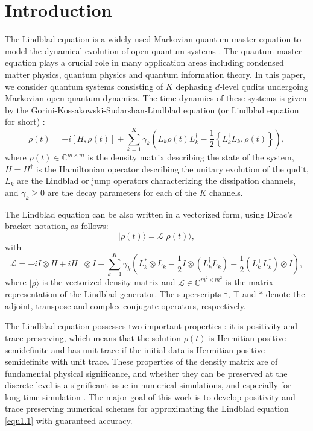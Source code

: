 \documentclass[preprint,3p,compress,12pt]{elsarticle}
\numberwithin{equation}{section}
\numberwithin{figure}{section}
\begin{document}
\section{Introduction}
The Lindblad equation is a widely used Markovian quantum master equation to model the dynamical evolution of open quantum systems \cite{Breuer,Davies1976}. The quantum master equation plays a crucial role in many application areas including condensed matter physics, quantum physics and quantum information theory. In this paper, we consider quantum systems consisting of $K$ dephasing $d$-level qudits undergoing Markovian open quantum dynamics. The time dynamics of these systems is given by the Gorini-Kossakowski-Sudarshan-Lindblad equation (or Lindblad equation for short) \cite{Gorini,Lindblad}:
\begin{equation}\label{equ1.1}
  \dot{\rho}(t)=-i[H,\rho(t)]+\sum_{k=1}^K\gamma_k\left(L_k\rho(t) L_k^{\dag}-\frac{1}{2}\left\{L_k^{\dag}L_k,\rho(t)\right\}\right),
\end{equation}
where $\rho(t)\in \mathbb{C}^{m\times m}$ is the density matrix describing the state of the system, $H=H^{\dag}$ is the Hamiltonian operator describing the unitary evolution of the qudit, $L_k$ are the Lindblad or jump operators characterizing the dissipation channels, and $\gamma_k\geq0$ are the decay parameters for each of the $K$ channels.

The Lindblad equation can be also written in a vectorized form,
using Dirac's bracket notation, as follows:
\begin{equation}\label{equ1.2}
  |\dot{\rho}(t)\rangle=\mathcal{L}|\rho(t)\rangle,
\end{equation}
with
\begin{equation*}
  \mathcal{L}=-i I\otimes H+i H^\top\otimes I+\sum_{k=1}^K\gamma_k
  \left(L_k^*\otimes L_k-\frac{1}{2}I\otimes (L_k^{\dag}L_k)-\frac{1}{2}(L_k^\top L_k^*)\otimes I\right),
\end{equation*}
where $|\rho\rangle$ is the vectorized density matrix and $\mathcal{L}\in \mathbb{C}^{m^2\times m^2}$ is the matrix representation of the Lindblad generator. The superscripts $\dag$, $\top$ and $*$ denote the adjoint, transpose and complex conjugate operators, respectively.

The Lindblad equation possesses two important properties \cite{Gorini,Lindblad}:
it is positivity and trace preserving, which means that the solution $\rho(t)$ is Hermitian positive semidefinite and has unit trace if the initial data is Hermitian positive semidefinite with unit trace. These properties of the density
matrix are of fundamental physical significance, and whether they
can be preserved at the discrete level is a significant issue in numerical simulations, and especially for long-time simulation \cite{Riesch}. The major goal of this work is to develop positivity and trace preserving numerical schemes for approximating the Lindblad equation \eqref{equ1.1} with guaranteed accuracy.
\end{document}
